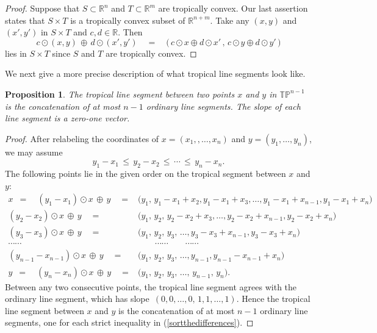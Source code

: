 \documentclass[11pt]{amsart}
\newtheorem{prop}[thm]{Proposition}
\newcommand{\RR}{\mathbb{R}}
\newcommand{\TP}{\mathbb{TP}}
\begin{document}
\begin{proof}
Suppose that $S\subset \RR^n$ and $T\subset \RR^m$ are tropically convex.
Our last assertion states that $S\times T$ is a tropically
convex subset of $\RR^{n+m}$. Take any $(x,y)$ and $(x',y')$ in $S\times T$
and $c,d \in \RR$. Then
$$ c \odot (x,y) \,\oplus \,
d \odot (x',y') \quad = \quad
\bigl( \,c \odot x \oplus d \odot x' \, , \,
         c \odot y \oplus d \odot y' \, \bigr) $$
lies in $S \times T$ since $S$ and $T$ are tropically convex.
\end{proof}

We next give a more precise description of
what tropical line segments look like.

\begin{prop}\label{slopes}
The tropical line segment between two points $x$ and $y$ in $\TP^{n-1}$
is the concatenation of at most $n-1$ ordinary line  segments.
The slope of each line segment is a zero-one vector.
\end{prop}

\begin{proof}
After relabeling the coordinates of
 $x = (x_1,,\ldots,x_n) $ and
$y = (y_1,\ldots,y_n)$, we may assume
\begin{equation}
\label{sortthedifferences}
 y_1 - x_1
\,\leq\, y_2 - x_2\, \leq\, \cdots\, \leq \,y_n - x_n .
\end{equation}
The following points lie in the given order
 on the tropical segment between $x$ and $y$:
\begin{eqnarray*}
x \,\,\, = \quad (y_1-x_1) \odot x \,\oplus \,  y \quad = &
\bigl( y_1,\,
 y_1\!-\!x_1 \!+\! x_2,
 y_1\!-\!x_1 \!+\! x_3, \ldots,
 y_1\!- \!x_1 \!+\! x_{n-1},
 y_1\!-\!x_1 \!+\! x_n \bigr) \\
 (y_2-x_2) \odot x \,\oplus \,  y  \quad = &
 \bigl( y_1,\,  y_2, \,
 y_2\!-\!x_2 \!+\! x_3, \ldots,
 y_2\!- \!x_2 \!+\! x_{n-1},
  y_2\!-\!x_2 \!+\! x_n \bigr) \\
 (y_3-x_3) \odot x \,\oplus \,  y  \quad = &
 \bigl( y_1,\,  y_2, \, y_3, \, \ldots,
 y_3\!- \!x_3 \!+\! x_{n-1},
  y_3\!-\!x_3 \!+\! x_n \bigr) \\
 \cdots \cdots \qquad \qquad & \qquad \cdots \cdots  \qquad \cdots \cdots
\\
 (y_{n-1}-x_{n-1}) \odot x \,\oplus \,  y \quad = &
 \bigl( y_1,\,  y_2, \, y_3, \, \ldots, y_{n-1},
 y_{n-1}\!-\!x_{n-1} \!+\! x_n \bigr)  \\
 y \,\,\, = \quad  (y_{n}-x_{n}) \odot x \,\oplus \,  y \quad = &
 \bigl( y_1,\,  y_2, \, y_3, \, \ldots,\, y_{n-1}, \,y_n \bigr).
\end{eqnarray*}
Between any two consecutive points, the tropical
line segment agrees with the ordinary line segment, which has slope
$\,(0,0,\ldots,0,\,1,1,\ldots,1)$.
Hence the tropical line segment between $x$ and $y$
is the concatenation of at most $n-1$ ordinary line segments,
one for each strict inequality in
(\ref{sortthedifferences}).
\end{proof}
\end{document}
